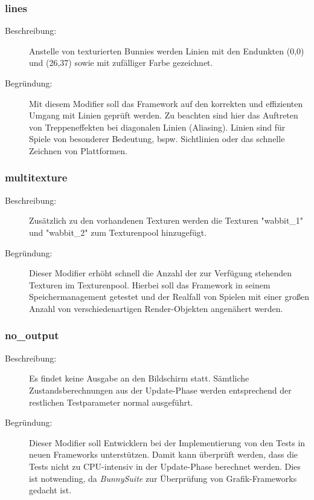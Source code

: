 \subsubsection{lines}
\begin{description}
\item[Beschreibung:] Anstelle von texturierten Bunnies werden Linien mit den Endunkten (0,0) und (26,37) sowie mit zufälliger Farbe gezeichnet. \\
\item[Begründung:] Mit diesem Modifier soll das Framework auf den korrekten und effizienten Umgang mit Linien geprüft werden. Zu beachten sind hier das Auftreten von Treppeneffekten bei diagonalen Linien (Aliasing). Linien sind für Spiele von besonderer Bedeutung, bspw. Sichtlinien oder das schnelle Zeichnen von Plattformen.
\end{description}

\subsubsection{multitexture}
\begin{description}
\item[Beschreibung:] Zusätzlich zu den vorhandenen Texturen werden die Texturen "wabbit\_1" und "wabbit\_2" zum Texturenpool hinzugefügt. \\
\item[Begründung:] Dieser Modifier erhöht schnell die Anzahl der zur Verfügung stehenden Texturen im Texturenpool. Hierbei soll das Framework in seinem Speichermanagement getestet und der Realfall von Spielen mit einer großen Anzahl von verschiedenartigen Render-Objekten angenähert werden.
\end{description}

\subsubsection{no\_output}
\begin{description}
\item[Beschreibung:] Es findet keine Ausgabe an den Bildschirm statt. Sämtliche Zustandsberechnungen aus der Update-Phase werden entsprechend der restlichen Testparameter normal ausgeführt. \\
\item[Begründung:] Dieser Modifier soll Entwicklern bei der Implementierung von den Tests in neuen Frameworks unterstützen. Damit kann überprüft werden, dass die Tests nicht zu CPU-intensiv in der Update-Phase berechnet werden. Dies ist notwending, da \textit{BunnySuite} zur Überprüfung von Grafik-Frameworks gedacht ist.
\end{description}

